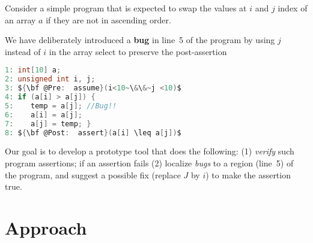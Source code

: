 \documentclass[letterpaper]{article} %
\begin{document}
Consider a simple program that is expected to swap the values at $i$ and $j$ index of an array $a$ if they are not in ascending order.

We have deliberately introduced a {\bf bug} in line~5 of the program by using $j$ instead of $i$ in the array select to preserve the post-assertion\\ 

\begin{lstlisting}[language=C, mathescape=true]
1: int[10] a;
2: unsigned int i, j;
3: ${\bf @Pre:  assume}(i<10~\&\&~j <10)$
4: if (a[i] > a[j]) {
5:    temp = a[j]; //Bug!!
6:    a[i] = a[j];
7:    a[j] = temp; }
8: ${\bf @Post:  assert}(a[i] \leq a[j])$
\end{lstlisting}
$ $\\
Our goal is to develop a prototype tool that does the following:
(1) \emph{verify} such program assertions; if an assertion fails (2) localize \emph{bugs} to a region (line~5) of the program, and suggest a possible fix (replace $J$ by $i$) to make the assertion true.
\section {Approach}
\end{document}
